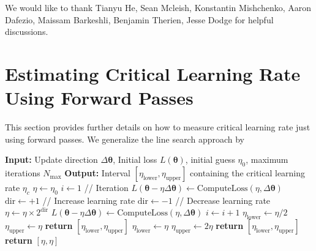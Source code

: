 \documentclass[]{fairmeta}
\theoremstyle{plain}
\theoremstyle{definition}
\begin{document}
We would like to thank Tianyu He, Sean Mcleish, Konstantin Mishchenko, Aaron Dafezio, Maissam Barkeshli, Benjamin Therien, Jesse Dodge for helpful discussions. 



\clearpage
\newpage
\beginappendix


\section{Estimating Critical Learning Rate Using Forward Passes}
\label{appendix:critical-lr-estimation}

This section provides further details on how to measure critical learning rate just using forward passes. We generalize the line search approach by \cite{kalra2024why}

\begin{algorithm}[H]
\caption{Exponential Search}
\label{alg:exponential_search}
\begin{algorithmic}[1]
\STATE \textbf{Input:} Update direction $\Delta \bm{\theta}$, Initial loss $L(\bm{\theta})$, initial guess $\eta_0$, maximum iterations $N_{\max}$
\STATE \textbf{Output:} Interval $[\eta_{\text{lower}}, \eta_{\text{upper}}]$ containing the critical learning rate $\eta_c$
\STATE $\eta \gets \eta_0$
\STATE $i \gets 1 $ \hfill // Iteration
\STATE $L(\bm{\theta} - \eta \Delta \bm{\theta}) \gets \text{ComputeLoss}(\eta, \Delta \bm{\theta})$
    \STATE $\text{dir} \gets +1$ \hfill // Increase learning rate
\ELSE
    \STATE $\text{dir} \gets -1$ \hfill // Decrease learning rate
\ENDIF
{}
    \STATE $\eta \gets \eta \times 2^{\text{dir}}$
    \STATE $L(\bm{\theta} - \eta \Delta \bm{\theta}) \gets \text{ComputeLoss}(\eta, \Delta \bm{\theta})$
    \STATE $i \gets i + 1$
        \STATE $\eta_{\text{lower}} \gets \eta / 2$
        \STATE $\eta_{\text{upper}} \gets \eta$
        \STATE \textbf{return} $[\eta_{\text{lower}}, \eta_{\text{upper}}]$
    \ENDIF
        \STATE $\eta_{\text{lower}} \gets \eta$
        \STATE $\eta_{\text{upper}} \gets 2\eta$
        \STATE \textbf{return} $[\eta_{\text{lower}}, \eta_{\text{upper}}]$
    \ENDIF
\ENDWHILE
\STATE \textbf{return} $[\eta, \eta]$
\end{algorithmic}
\end{algorithm}
\end{document}
